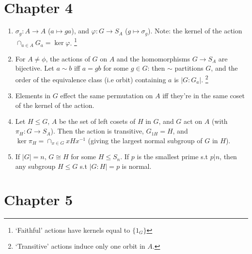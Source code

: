 \documentclass{article}
\begin{document}
\section*{Chapter 4}

\begin{enumerate}[1.]
    \item $\sigma_g : A \rightarrow A$ ($a \mapsto ga$), and
        $\varphi : G \rightarrow S_A$ ($g \mapsto \sigma_g$). 
        Note: the kernel of the action $\cap_{a \in A} G_a = \ker \varphi$.
        \footnote{`Faithful' actions have kernels equal to $\{1_G\}$}
    \item For $A \not= \phi$, the actions of $G$ on $A$ and the
        homomorphisms $G \rightarrow S_A$ are bijective. Let $a \sim b$ iff $a
        = gb$ for some $g \in G$: then $\sim$ partitions $G$, and the order
        of the equivalence class (i.e orbit) containing $a$ is $|G : G_a|$.
        \footnote{`Transitive' actions induce only one orbit in $A$.}
    \item Elements in $G$ effect the same permutation on $A$ iff they're in
        the same coset of the kernel of the action.
    \item Let $H \leq G$, $A$ be the set of left cosets of $H$ in $G$, and
        $G$ act on $A$ (with $\pi_H : G \rightarrow S_A$). Then the action
        is transitive, $G_{1H} = H$, and $\ker \pi_H = \cap_{x \in G}
        xHx^{-1}$ (giving the largest normal subgroup of $G$ in $H$).
    \item If $|G| = n$, $G \cong H$ for some $H \leq S_n$. If $p$ is the
        smallest prime s.t $p | n$, then any subgroup $H \leq G$ s.t $|G :
        H| = p$ is normal.
\end{enumerate}

\section*{Chapter 5}
\end{document}
